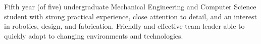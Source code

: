 
\begin{center}
	\begin{minipage}[t]{0.90\textwidth}
		Fifth year (of five) undergraduate Mechanical Engineering and Computer Science student with strong practical experience, close attention to detail, and an interest in robotics, design, and fabrication. Friendly and effective team leader able to quickly adapt to changing environments and technologies.
	\end{minipage}
\end{center}